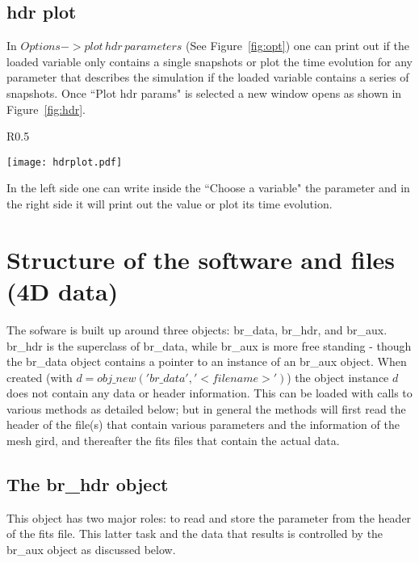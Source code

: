 \documentclass[12pt,preprint]{aastex}
\begin{document}
\subsection{hdr plot}


In $Options->  plot\, hdr\, parameters$ (See Figure~\ref{fig:opt}) one can print 
out if the loaded variable only 
contains a single snapshots or plot the time evolution for any parameter that 
describes the simulation if the loaded variable contains a series of snapshots. 
Once ``Plot hdr params" is selected a new window opens as shown in Figure~\ref{fig:hdr}.


\begin{wrapfigure}{R}{0.5\textwidth}
\vspace{-1.2cm}
\begin{center}
	\texttt{[image: hdrplot.pdf]}
\end{center}
\vspace{-0.56cm}
\caption{\label{fig:hdr} Screenshot of the Plot hdr window.}
\vspace{-1.cm}
\end{wrapfigure}

In the left side one can write inside the ``Choose a variable" the parameter and 
in the right side it will print out the value or plot its time evolution. 

\section{Structure of the software and files (4D data)}

The sofware is built up around three objects: br\_data, br\_hdr, and br\_aux. br\_hdr 
is the superclass of br\_data, while br\_aux is more free standing - though the br\_data 
object contains a pointer to an instance of an br\_aux object. When created (with 
$d=obj\_new('br\_data','<filename>')$) the object 
instance $d$ does not contain any data or header information. This can be loaded with calls to 
various methods as detailed below; but in general the methods will first read the header of the 
file(s) that contain various parameters and the information of the mesh gird, and thereafter the 
fits files that contain the actual data. 

\subsection{The br\_hdr object}

This object has two major roles: to read and store the parameter from the header of the 
fits file. This latter 
task and the data that results is controlled by the br\_aux object as discussed below.
\end{document}
